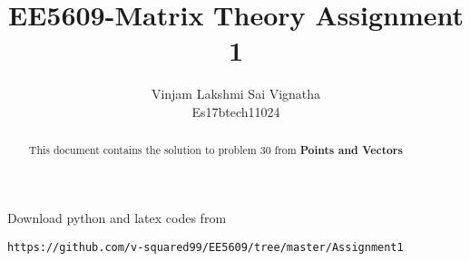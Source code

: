 \documentclass[journal,12pt,twocolumn]{IEEEtran}
\begin{document}
\newtheorem{theorem}{Theorem}[section]
\newtheorem{problem}{Problem}
\newtheorem{proposition}{Proposition}[section]
\newtheorem{lemma}{Lemma}[section]
\newtheorem{corollary}[theorem]{Corollary}
\newtheorem{example}{Example}[section]
\newtheorem{definition}[problem]{Definition}

\newcommand{\BEQA}{\begin{eqnarray}}
\newcommand{\EEQA}{\end{eqnarray}}
\newcommand{\define}{\stackrel{\triangle}{=}}

\providecommand{\mbf}{\mathbf}
\providecommand{\pr}[1]{\ensuremath{\Pr\left(#1\right)}}
\providecommand{\qfunc}[1]{\ensuremath{Q\left(#1\right)}}
\providecommand{\sbrak}[1]{\ensuremath{{}\left[#1\right]}}
\providecommand{\lsbrak}[1]{\ensuremath{{}\left[#1\right.}}
\providecommand{\rsbrak}[1]{\ensuremath{{}\left.#1\right]}}
\providecommand{\brak}[1]{\ensuremath{\left(#1\right)}}
\providecommand{\lbrak}[1]{\ensuremath{\left(#1\right.}}
\providecommand{\rbrak}[1]{\ensuremath{\left.#1\right)}}
\providecommand{\cbrak}[1]{\ensuremath{\left\{#1\right\}}}
\providecommand{\lcbrak}[1]{\ensuremath{\left\{#1\right.}}
\providecommand{\rcbrak}[1]{\ensuremath{\left.#1\right\}}}
\theoremstyle{remark}
\newtheorem{rem}{Remark}
\newcommand{\sgn}{\mathop{\mathrm{sgn}}}
\providecommand{\system}{\overset{\mathcal{H}}{ \longleftrightarrow}}
\newcommand{\solution}{\noindent \textbf{Solution: }}
\newcommand{\cosec}{\,\text{cosec}\,}
\providecommand{\dec}[2]{\ensuremath{\overset{#1}{\underset{#2}{\gtrless}}}}
\newcommand{\myvec}[1]{\ensuremath{\begin{pmatrix}#1\end{pmatrix}}}
\newcommand{\mydet}[1]{\ensuremath{\begin{vmatrix}#1\end{vmatrix}}}
\makeatletter
{}
\makeatother
\let\StandardTheFigure\thefigure
\let\vec\mathbf
\renewcommand{\thefigure}{\theproblem}
\def\putbox#1#2#3{\makebox[0in][l]{\makebox[#1][l]{}\raisebox{\baselineskip}[0in][0in]{\raisebox{#2}[0in][0in]{#3}}}}
     \def\rightbox#1{\makebox[0in][r]{#1}}
     \def\centbox#1{\makebox[0in]{#1}}
     \def\topbox#1{\raisebox{-\baselineskip}[0in][0in]{#1}}
     \def\midbox#1{\raisebox{-0.5\baselineskip}[0in][0in]{#1}}
\vspace{3cm}
\title{EE5609-Matrix Theory Assignment 1}
\author{Vinjam Lakshmi Sai Vignatha \\ Es17btech11024}
\maketitle
\newpage
\bigskip
\renewcommand{\thefigure}{\theenumi}
\renewcommand{\thetable}{\theenumi}
Download python and latex codes from 
\begin{lstlisting}
https://github.com/v-squared99/EE5609/tree/master/Assignment1
\end{lstlisting}
\begin{abstract}
This document contains the solution to problem 30 from \textbf{Points and Vectors}
\end{abstract}
\end{document}
